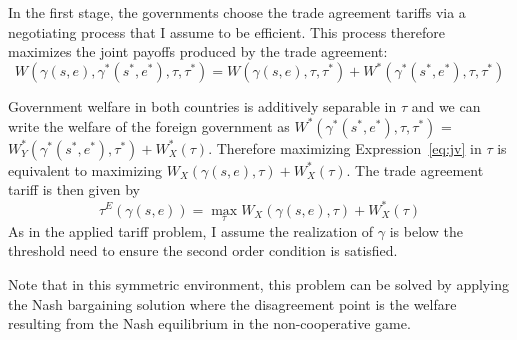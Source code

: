 \documentclass[12pt]{article}
\newcommand{\ga}{\gamma}
\begin{document}
In the first stage, the governments choose the trade agreement tariffs via a negotiating process that I assume to be efficient. This process therefore maximizes the joint payoffs produced by the trade agreement:
\begin{equation}
  W(\ga(s,e),\ga^*(s^*,e^*),\tau,\tau^*) = W(\ga(s,e),\tau,\tau^*) + W^*(\ga^*(s^*,e^*),\tau,\tau^*)
  \label{eq:jv}
\end{equation}

Government welfare in both countries is additively separable in $\tau$ and we can write the welfare of the foreign government as $W^*(\ga^*(s^*,e^*),\tau,\tau^*)$ = $W_Y^*(\ga^*(s^*,e^*),\tau^*) + W_X^*(\tau)$. Therefore maximizing Expression~\ref{eq:jv} in $\tau$ is equivalent to maximizing $W_X(\ga(s,e),\tau) + W_X^*(\tau)$. The trade agreement tariff is then given by
\begin{equation}
  \tau^E(\ga(s,e)) = \max_\tau W_X(\ga(s,e),\tau) + W_X^*(\tau)
  \label{eq:eff}
\end{equation}
As in the applied tariff problem, I assume the realization of $\ga$ is below the threshold need to ensure the second order condition is satisfied.

Note that in this symmetric environment, this problem can be solved by applying the Nash bargaining solution where the disagreement point is the welfare resulting from the Nash equilibrium in the non-cooperative game.
\end{document}
